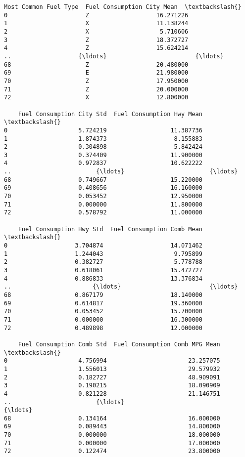 \documentclass[11pt]{article}
\begin{document}
\begin{tcolorbox}[breakable, size=fbox, boxrule=.5pt, pad at break*=1mm, opacityfill=0]
\begin{Verbatim}[commandchars=\\\{\}]
   Most Common Fuel Type  Fuel Consumption City Mean  \textbackslash{}
0                      Z                   16.271226
1                      X                   11.138244
2                      X                    5.710606
3                      Z                   18.372727
4                      Z                   15.624214
..                   {\ldots}                         {\ldots}
68                     Z                   20.480000
69                     E                   21.980000
70                     Z                   17.950000
71                     Z                   20.000000
72                     X                   12.800000

    Fuel Consumption City Std  Fuel Consumption Hwy Mean  \textbackslash{}
0                    5.724219                  11.387736
1                    1.874373                   8.155883
2                    0.304898                   5.842424
3                    0.374409                  11.900000
4                    0.972837                  10.622222
..                        {\ldots}                        {\ldots}
68                   0.749667                  15.220000
69                   0.408656                  16.160000
70                   0.053452                  12.950000
71                   0.000000                  11.800000
72                   0.578792                  11.000000

    Fuel Consumption Hwy Std  Fuel Consumption Comb Mean  \textbackslash{}
0                   3.704874                   14.071462
1                   1.244043                    9.795899
2                   0.382727                    5.778788
3                   0.618061                   15.472727
4                   0.886833                   13.376834
..                       {\ldots}                         {\ldots}
68                  0.867179                   18.140000
69                  0.614817                   19.360000
70                  0.053452                   15.700000
71                  0.000000                   16.300000
72                  0.489898                   12.000000

    Fuel Consumption Comb Std  Fuel Consumption Comb MPG Mean  \textbackslash{}
0                    4.756994                       23.257075
1                    1.556013                       29.579932
2                    0.182727                       48.909091
3                    0.190215                       18.090909
4                    0.821228                       21.146751
..                        {\ldots}                             {\ldots}
68                   0.134164                       16.000000
69                   0.089443                       14.800000
70                   0.000000                       18.000000
71                   0.000000                       17.000000
72                   0.122474                       23.800000


\end{Verbatim}
\end{tcolorbox}
\end{document}
